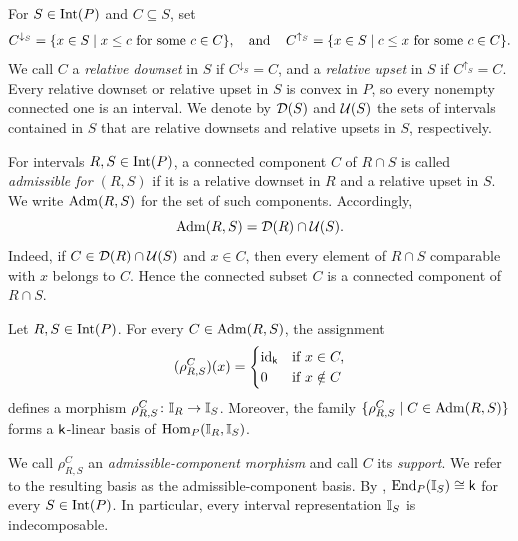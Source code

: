 For $S\in\operatorname{Int}(P)$ and $C\subseteq S$, set
\begin{equation}
C^{\downarrow_S}
=
\{x\in S\mid x\leq c \text{ for some } c\in C\},
\operatorname{\quad \text{and} \quad}\nolimits
C^{\uparrow_S}
=
\{x\in S\mid c\leq x \text{ for some } c\in C\}.
\label{eq:relative-closures}
\end{equation}
We call $C$ a \emph{relative downset} in $S$ if
$C^{\downarrow_S}=C$, and a \emph{relative upset} in $S$ if
$C^{\uparrow_S}=C$.
Every relative downset or relative upset in $S$ is convex in $P$, so
every nonempty connected one is an interval.
We denote by $\mathcal D(S)$ and $\mathcal U(S)$ the sets of
intervals contained in $S$ that are relative downsets and relative
upsets in $S$, respectively.

For intervals $R,S\in\operatorname{Int}(P)$, a connected component $C$ of $R\cap S$
is called \emph{admissible for $(R,S)$} if it is a relative downset in $R$
and a relative upset in $S$. We write $\operatorname{Adm}(R,S)$ for the set of such
components. Accordingly,
\begin{equation}
\operatorname{Adm}(R,S)
=
\mathcal D(R)\cap\mathcal U(S).
\label{eq:admissible-components-as-relative-subsets}
\end{equation}
Indeed, if $C\in\mathcal D(R)\cap\mathcal U(S)$ and $x\in C$, then every element of $R\cap S$ comparable with $x$ belongs to $C$. Hence the connected subset $C$ is a connected component of $R\cap S$.

\begin{proposition}\label{prop:interval-hom-admissible-basis}
Let $R,S\in \operatorname{Int}(P)$.
For every $C\in\operatorname{Adm}(R,S)$, the assignment
\begin{equation}
(\rho_{R,S}^C)(x)=
\begin{cases}
\operatorname{id}_{\mathsf{k}} & \text{if } x\in C,\\
0       & \text{if } x\notin C
\end{cases}
\label{eq:rho-definition}
\end{equation}
defines a morphism $\rho_{R,S}^C\colon\mathbb I_R\to\mathbb I_S$. Moreover, the family
$\{\rho_{R,S}^C\mid C\in\operatorname{Adm}(R,S)\}$ forms a $\mathsf{k}$-linear basis of
$\operatorname{Hom}_P(\mathbb I_R,\mathbb I_S)$.
\end{proposition}

We call $\rho_{R,S}^C$ an \emph{admissible-component morphism} and call
$C$ its \emph{support}.  
We refer to the resulting basis as the admissible-component basis.
By ,
$\operatorname{End}_P(\mathbb I_S)\cong\mathsf{k}$ for every $S\in\operatorname{Int}(P)$.
In particular, every interval representation $\mathbb I_S$ is indecomposable.

